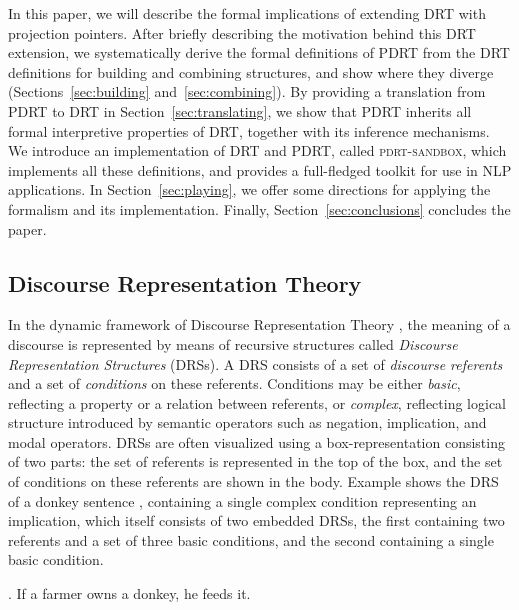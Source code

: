 In this paper, we will describe the formal implications of extending DRT
with projection pointers. After briefly describing the motivation behind
this DRT extension, we systematically derive the formal definitions of PDRT
from the DRT definitions for building and combining structures, and show
where they diverge (Sections~\ref{sec:building} and~\ref{sec:combining}). By
providing a translation from PDRT to DRT in Section~\ref{sec:translating},
we show that PDRT inherits all formal interpretive properties of DRT,
together with its inference mechanisms.  We introduce an implementation of
DRT and PDRT, called \textsc{pdrt-sandbox}, which implements all these
definitions, and provides a full-fledged toolkit for use in NLP
applications. In Section~\ref{sec:playing}, we offer some directions for
applying the formalism and its implementation. Finally,
Section~\ref{sec:conclusions} concludes the paper.

\subsection{Discourse Representation Theory}

In the dynamic framework of Discourse Representation Theory
, the meaning of a discourse is
represented by means of recursive structures called \textit{Discourse
Representation Structures} (DRSs). A DRS consists of a set of
\textit{discourse referents} and a set of \textit{conditions} on these
referents. Conditions may be either \textit{basic}, reflecting a property or
a relation between referents, or \textit{complex}, reflecting logical
structure introduced by semantic operators such as negation, implication,
and modal operators. DRSs are often visualized using a box-representation
consisting of two parts: the set of referents is represented in the top of
the box, and the set of conditions on these referents are shown in the body.
Example \Next shows the DRS of a donkey sentence
, containing a single complex
condition representing an implication, which itself consists of two embedded
DRSs, the first containing two referents and a set of three basic
conditions, and the second containing a single basic condition.

\ex. If a farmer owns a donkey, he feeds it.\\\hspace*{-0.2cm}

